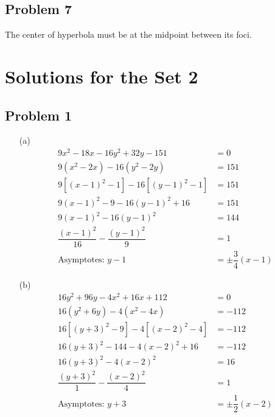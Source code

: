 \documentclass[12pt]{article}
\begin{document}
\subsection*{Problem 7}
The center of hyperbola must be at the midpoint between its foci.

\section*{Solutions for the Set 2}
\subsection*{Problem 1}
\begin{enumerate}
    \item[(a)] 
    \begin{align*}
    9x^2 - 18x - 16y^2 + 32y - 151 &= 0 \\
    9(x^2 - 2x) - 16(y^2 - 2y) &= 151 \\
    9[(x - 1)^2 - 1] - 16[(y - 1)^2 - 1] &= 151 \\
    9(x - 1)^2 - 9 - 16(y - 1)^2 + 16 &= 151 \\
    9(x - 1)^2 - 16(y - 1)^2 &= 144 \\
    \dfrac{(x - 1)^2}{16} - \dfrac{(y - 1)^2}{9} &= 1 \\
    \text{Asymptotes: } y - 1 &= \pm \dfrac{3}{4}(x - 1)
    \end{align*}

    \item[(b)] 
    \begin{align*}
    16y^2 + 96y - 4x^2 + 16x + 112 &= 0 \\
    16(y^2 + 6y) - 4(x^2 - 4x) &= -112 \\
    16[(y + 3)^2 - 9] - 4[(x - 2)^2 - 4] &= -112 \\
    16(y + 3)^2 - 144 - 4(x - 2)^2 + 16 &= -112 \\
    16(y + 3)^2 - 4(x - 2)^2 &= 16 \\
    \dfrac{(y + 3)^2}{1} - \dfrac{(x - 2)^2}{4} &= 1 \\
    \text{Asymptotes: } y + 3 &= \pm \dfrac{1}{2}(x - 2)
    \end{align*}
\end{enumerate}
\end{document}
